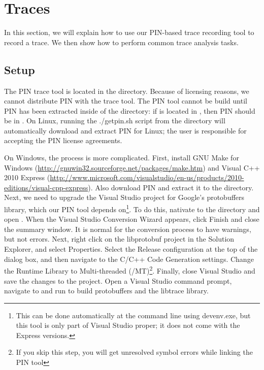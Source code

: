 \section{Traces}

In this section, we will explain how to use our PIN-based trace
recording tool to record a trace.  We then show how to perform common
trace analysis tasks.

\subsection{Setup}

The PIN trace tool is located in the  directory.
Because of licensing reasons, we cannot distribute PIN with the trace
tool.  The PIN tool cannot be build until PIN has been extracted
inside of the \bap directory: if \bap is located in
, then PIN should be in
.  On Linux, running the ./getpin.sh script
from the  directory will
automatically download and extract PIN for Linux; the user is
responsible for accepting the PIN license agreements.

On Windows, the process is more complicated.  First, install GNU Make
for Windows (\url{http://gnuwin32.sourceforge.net/packages/make.htm})
and Visual C++ 2010 Express
(\url{http://www.microsoft.com/visualstudio/en-us/products/2010-editions/visual-cpp-express}).
Also download PIN and extract it to the 
directory.  Next, we need to upgrade the Visual Studio project for
Google's protobuffers library, which our PIN tool depends
on\footnote{This can be done automatically at the command line using
  devenv.exe, but this tool is only part of Visual Studio proper; it
  does not come with the Express versions.}.  To do this, nativate to
the 
directory and open .  When the Visual Studio
Conversion Wizard appears, click Finish and close the summary window.
It is normal for the conversion process to have warnings, but not
errors.  Next, right click on the libprotobuf project in the Solution
Explorer, and select Properties.  Select the Release configuration at
the top of the dialog box, and then navigate to the C/C++ Code
Generation settings.  Change the Runtime Library to Multi-threaded
(/MT)\footnote{If you skip this step, you will get unresolved symbol
  errors while linking the PIN tool}.  Finally, close Visual Studio
and save the changes to the project.  Open a Visual Studio command
prompt, navigate to
 and run
 to build protobuffers and the
libtrace library.

